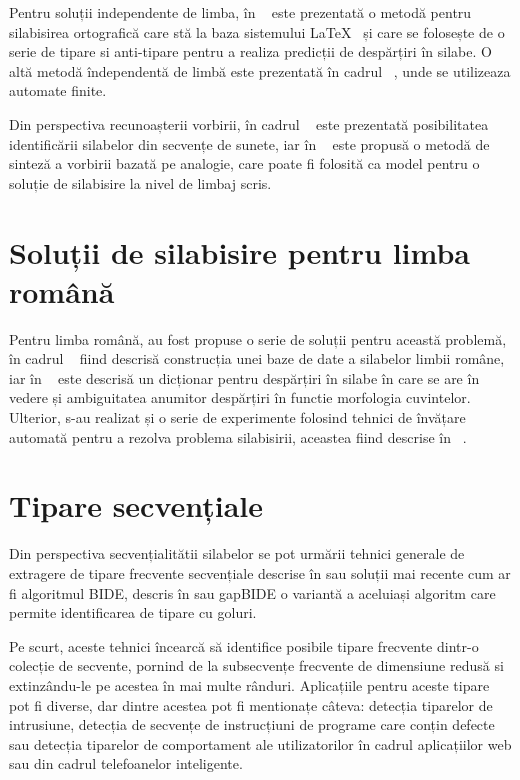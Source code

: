 Pentru soluții independente de limba, în ~\cite{bib:liang1983word} este prezentată o metodă pentru silabisirea ortografică care stă la baza sistemului \LaTeX ~ și care se folosește de o serie de tipare si anti-tipare pentru a realiza predicții de despărțiri în silabe. O altă metodă îndependentă de limbă este prezentată în cadrul ~\cite{bib:kiraz1998multilingual}, unde se utilizeaza automate finite. 

Din perspectiva recunoașterii vorbirii, în cadrul ~\cite{bib:hunt1980experiments} este prezentată posibilitatea identificării silabelor din secvențe de sunete, iar în ~\cite{bib:damper1997pronunciation} este propusă o metodă de sinteză a vorbirii bazată pe analogie, care poate fi folosită ca model pentru o soluție de silabisire la nivel de limbaj scris. 

\section{Soluții de silabisire pentru limba română}

Pentru limba română, au fost propuse o serie de soluții pentru această problemă, în cadrul ~\cite{bib:dinu2004despartirea} fiind descrisă construcția unei baze de date a silabelor limbii române, iar în ~\cite{bib:BARBU08.495} este descrisă un dicționar pentru despărțiri în silabe în care se are în vedere și ambiguitatea anumitor despărțiri în functie morfologia cuvintelor. Ulterior, s-au realizat și o serie de experimente folosind tehnici de învățare automată pentru a rezolva problema silabisirii, aceastea fiind descrise în ~\cite{bib:dinu2013romanian}.


\section{Tipare secvențiale}

Din perspectiva secvențialitătii silabelor se pot urmării tehnici generale de extragere de tipare frecvente secvențiale descrise în \cite{bib:agrawal1995mining} sau soluții mai recente cum ar fi algoritmul BIDE, descris în \cite{bib:wang2004bide} sau gapBIDE \cite{bib:gapbide} o variantă a aceluiași algoritm care permite identificarea de tipare cu goluri. 

Pe scurt, aceste tehnici încearcă să identifice posibile tipare frecvente dintr-o colecție de secvente, pornind de la subsecvențe frecvente de dimensiune redusă si extinzându-le pe acestea în mai multe rânduri. Aplicațiile pentru aceste tipare pot fi diverse, dar dintre acestea pot fi mentionațe câteva: detecția tiparelor de intrusiune, detecția de secvențe de instrucțiuni de programe care conțin defecte sau detecția tiparelor de comportament ale utilizatorilor în cadrul aplicațiilor web sau din cadrul telefoanelor inteligente.


